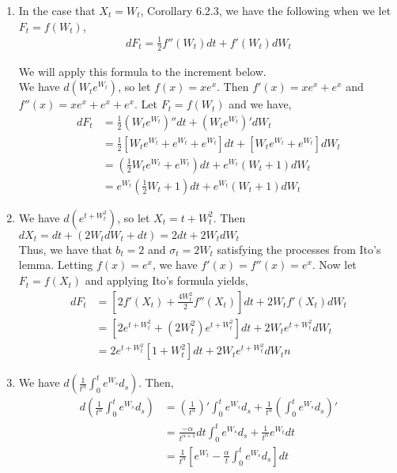 \documentclass[12pt]{article}
\begin{document}
\begin{enumerate}[\alph*)]
\item In the case that $X_t = W_t$, Corollary 6.2.3, we have the following when we let $F_t = f(W_t)$,
\begin{align*}
dF_t = \frac{1}{2} f''(W_t)dt + f'(W_t)dW_t
\end{align*}

We will apply this formula to the increment below.\\

We have $d(W_te^{W_t})$, so let $f(x) = xe^x$. Then $f'(x) = xe^x + e^x$ and $f''(x) = xe^x + e^x + e^x$. Let $F_t = f(W_t)$ and we have,
\begin{align*}
dF_t &= \frac{1}{2} (W_te^{W_t})'' dt + (W_te^{W_t})' dW_t\\
&= \frac{1}{2} [W_te^{W_t} + e^{W_t} + e^{W_t}] dt + [W_te^{W_t} + e^{W_t}] dW_t\\
&= (\frac{1}{2} W_te^{W_t} + e^{W_t}) dt + e^{W_t}(W_t + 1) dW_t\\
&= e^{W_t} (\frac{1}{2}W_t + 1) dt + e^{W_t}(W_t + 1) dW_t
\end{align*}

\item We have $d(e^{t+W_t^2})$, so let $X_t = t + W_t^2$. Then $dX_t = dt + (2W_tdW_t+dt) = 2dt + 2W_t dW_t$\\

Thus, we have that $b_t = 2$ and $\sigma_t = 2W_t$ satisfying the processes from Ito's lemma. Letting $f(x) = e^x$, we have $f'(x) = f''(x) = e^x$. Now let $F_t = f(X_t)$ and applying Ito's formula yields,
\begin{align*}
dF_t &= [2f'(X_t) + \frac{4W_t^2}{2}f''(X_t)]dt + 2W_t f'(X_t)dW_t\\
&= [2e^{t + W_t^2} + (2W_t^2)e^{t + W_t^2}]dt + 2W_t e^{t + W_t^2} dW_t\\
&= 2e^{t+W_t^2}[1 + W_t^2] dt + 2W_te^{t+W_t^2}dW_tn
\end{align*}

\item We have $d\left(\frac{1}{t^{\alpha}} \int_0^t e^{W_s} d_s\right)$. Then,
\begin{align*}
d\left(\frac{1}{t^{\alpha}} \int_0^t e^{W_s} d_s\right) &= \left(\frac{1}{t^\alpha}\right)' \int_0^t e^{W_s} d_s + \frac{1}{t^\alpha} \left(\int_0^t e^{W_s} d_s\right)'\\
&= \frac{-\alpha}{t^{\alpha+1}} dt \int_0^t e^{W_s} d_s + \frac{1}{t^\alpha} e^{W_t} dt\\
&= \frac{1}{t^{\alpha}} \left[e^{W_t} - \frac{\alpha}{t} \int_0^t e^{W_s} d_s\right]dt
\end{align*}

\end{enumerate}
\end{document}
